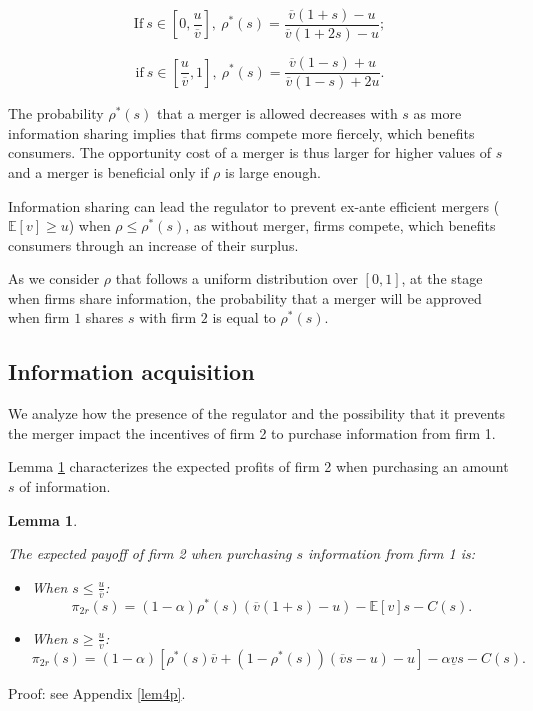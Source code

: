 \documentclass[a4paper,leqno]{article}%
\newtheorem{lemma}{Lemma}
\newcommand{\E}{\mathbb E}
\renewcommand{\a}{\alpha}
\newcommand{\uv}{\underline{v}}
\newcommand{\ov}{\overline{v}}
\begin{document}
$$\textrm{If}~s\in[0,\frac{u}{\ov}],~\rho^*(s)=\frac{\ov(1+s)-u}{\ov(1+2s)-u};$$

$$\textrm{if}~s\in[\frac{u}{\ov},1],~\rho^*(s)=\frac{\ov(1-s)+u}{\ov(1-s)+2u}.$$

\medskip

The probability $\rho^*(s)$ that a merger is allowed decreases with $s$ as more information sharing implies that firms compete more fiercely, which benefits consumers. The opportunity cost of a merger is thus larger for higher values of $s$ and a merger is beneficial only if $\rho$ is large enough. 

\medskip

Information sharing can lead the regulator to prevent ex-ante efficient mergers ($\E[v] \geq u$) when $\rho \leq \rho^*(s)$, as without merger, firms compete, which benefits consumers through an increase of their surplus. 

\medskip

As we consider $\rho$ that follows a uniform distribution over $[0,1]$, at the stage when firms share information, the probability that a merger will be approved when firm $1$ shares $s$ with firm $2$ is equal to $\rho^*(s)$.


\subsection{Information acquisition}

We analyze how the presence of the regulator and the possibility that it prevents the merger impact the incentives of firm 2 to purchase information from firm 1.

Lemma \ref{lem4} characterizes the expected profits of firm 2 when purchasing an amount $s$ of information.

\begin{lemma}~~\label{lem4}

The expected payoff of firm 2 when purchasing $s$ information from firm 1 is:

\begin{itemize}
    \item When $s\leq\frac{u}{\ov}$:
    $$\pi_{2r}(s)=(1-\a)\rho^*(s)(\ov(1+s)-u)-\E[v]s-C(s).$$
    \item When $s\geq \frac{u}{\ov}$:
    $$\pi_{2r}(s)=(1-\a)[\rho^*(s)\ov+(1-\rho^*(s))(\ov s-u)-u]-\a\uv s-C(s).$$
\end{itemize}
\end{lemma}

\noindent Proof: see Appendix \ref{lem4p}.
\end{document}
